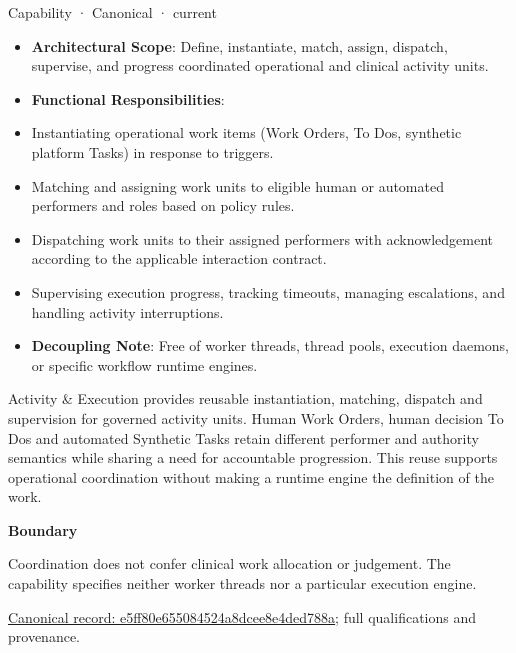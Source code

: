 \label{element:e5ff80e655084524a8dcee8e4ded788a}
{\small Capability · Canonical · current}\par

\begin{itemize}


\item \textbf{Architectural Scope}: Define, instantiate, match, assign, dispatch, supervise, and progress coordinated operational and clinical activity units.

\item \textbf{Functional Responsibilities}:

\item Instantiating operational work items (Work Orders, To Dos, synthetic platform Tasks) in response to triggers.

\item Matching and assigning work units to eligible human or automated performers and roles based on policy rules.

\item Dispatching work units to their assigned performers with acknowledgement according to the applicable interaction contract.

\item Supervising execution progress, tracking timeouts, managing escalations, and handling activity interruptions.

\item \textbf{Decoupling Note}: Free of worker threads, thread pools, execution daemons, or specific workflow runtime engines.

\end{itemize}


Activity \& Execution provides reusable instantiation, matching, dispatch and supervision for governed activity units. Human Work Orders, human decision To Dos and automated Synthetic Tasks retain different performer and authority semantics while sharing a need for accountable progression. This reuse supports operational coordination without making a runtime engine the definition of the work.



\textbf{Boundary}



Coordination does not confer clinical work allocation or judgement. The capability specifies neither worker threads nor a particular execution engine.


{\footnotesize \href{../../../../continuum/strategy/capability/e5ff80e655084524a8dcee8e4ded788a.md}{Canonical record: e5ff80e655084524a8dcee8e4ded788a}; full qualifications and provenance.}\par
